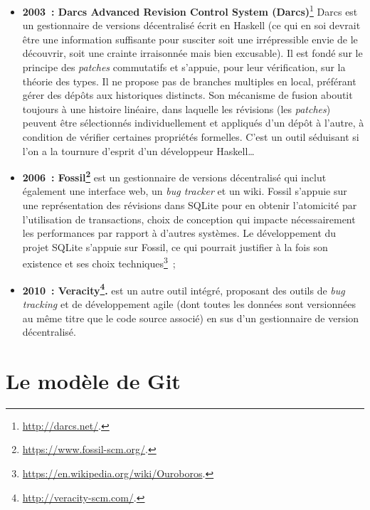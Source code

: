 \begin{itemize}
\item{\textbf{2003~: Darcs Advanced Revision Control System
      (Darcs)}\footnote{\url{http://darcs.net/}.}} Darcs
  est un gestionnaire de versions décentralisé écrit en Haskell (ce
  qui en soi devrait être une information suffisante pour susciter
  soit une irrépressible envie de le découvrir, soit une crainte
  irraisonnée mais bien excusable). Il est fondé sur le principe des
  \textit{patches} commutatifs et s'appuie, pour leur vérification,
  sur la théorie des types. Il ne propose pas de branches multiples en
  local, préférant gérer des dépôts aux historiques distincts. Son
  mécanisme de fusion aboutit toujours à une histoire linéaire, dans
  laquelle les révisions (les \textit{patches}) peuvent être
  sélectionnés individuellement et appliqués d'un dépôt à l'autre, à
  condition de vérifier certaines propriétés formelles. C'est un outil
  séduisant si l'on a la tournure d'esprit d'un développeur
  Haskell\ldots
\item \textbf{2006~:
    Fossil\footnote{\url{https://www.fossil-scm.org/}.}}
  est un gestionnaire de versions décentralisé qui inclut également
  une interface web, un \textit{bug tracker} et un wiki. Fossil
  s'appuie sur une représentation des révisions dans SQLite pour en
  obtenir l'atomicité par l'utilisation de transactions, choix de
  conception qui impacte nécessairement les performances par rapport à
  d'autres systèmes. Le développement du projet SQLite s'appuie sur
  Fossil, ce qui pourrait justifier à la fois son existence et ses
  choix
  techniques\footnote{\url{https://en.wikipedia.org/wiki/Ouroboros}.}~;
\item \textbf{2010~:
    Veracity\footnote{\url{http://veracity-scm.com/}.}.}
  est un autre outil intégré, proposant des outils de \textit{bug
    tracking} et de développement agile (dont toutes les données sont
  versionnées au même titre que le code source associé) en sus d'un
  gestionnaire de version décentralisé.
\end{itemize}

\section{Le modèle de Git} %


